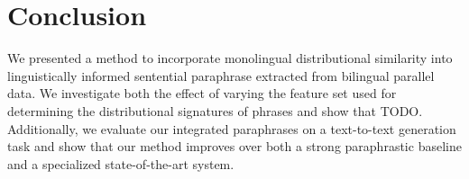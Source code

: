 \documentclass[11pt]{article}
\begin{document}
\section{Conclusion}
\label{sec-conclusion}

We presented a method to incorporate monolingual distributional
similarity into linguistically informed sentential paraphrase
extracted from bilingual parallel data. We investigate both the effect
of varying the feature set used for determining the distributional
signatures of phrases and show that TODO. Additionally, we evaluate
our integrated paraphrases on a text-to-text generation task and show
that our method improves over both a strong paraphrastic baseline and
a specialized state-of-the-art system.



\end{document}
